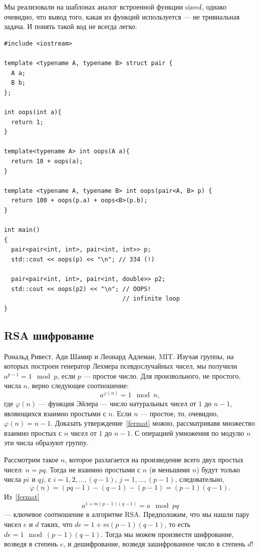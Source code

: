 \documentclass{book}
\begin{document}
Мы реализовали на шаблонах аналог встроенной функции sizeof, однако очевидно, что вывод того, какая
из функций используется --- не тривиальная задача. И понять такой код не всегда легко:
\begin{verbatim}
#include <iostream>

template <typename A, typename B> struct pair {
  A a;
  B b;
};

int oops(int a){
  return 1;
}

template<typename A> int oops(A a){
  return 10 + oops(a);
}

template <typename A, typename B> int oops(pair<A, B> p) {
  return 100 + oops(p.a) + oops<B>(p.b);
}

int main()
{
  pair<pair<int, int>, pair<int, int>> p;
  std::cout << oops(p) << "\n"; // 334 (!)

  pair<pair<int, int>, pair<int, double>> p2;
  std::cout << oops(p2) << "\n"; // OOPS!
                                 // infinite loop
}

\end{verbatim}

\subsection{RSA шифрование}

Рональд Ривест, Ади Шамир и Леонард Адлеман, MIT. Изучая группы, на которых построен генератор
Лехмера псевдослучайных чисел, мы получили $a^{p - 1} = 1 \mod p$, если $p$ --- простое число. Для
произвольного, не простого, числа $n$, верно следующее соотношение:
\begin{equation}
    \label{fermat}
    a^{\varphi(n)} = 1 \mod n,
\end{equation}
где $\varphi(n)$ --- функция Эйлера --- число натуральных чисел от $1$ до $n - 1$, являющихся
взаимно простыми с $n$. Если $n$ --- простое, то, очевидно, $\varphi(n) = n - 1$. Доказать
утверждение~\ref{fermat} можно, рассматривавя множество взаимно простых с $n$ чисел от $1$ до $n -
1$. С операцией умножения по модулю $n$ эти числа образуют группу.

Рассмотрим такое $n$, которое разлагается на произведение всего двух простых чисел: $n = pq$. Тогда
не взаимно простыми с $n$ (и меньшими $n$) будут только числа $pi$ и $q j$, с $i = 1, 2, ..., (q -
1)$, $j = 1,..., (p  - 1)$, следовательно,
\begin{equation}
    \varphi(n) = (p q - 1) - (q - 1) - (p - 1) = (p - 1)(q - 1).
\end{equation}
Из~\ref{fermat}
\begin{equation}
    a^{1 + m (p - 1) (q - 1)} = a \mod pq
\end{equation}
--- ключевое соотношение в алгоритме RSA. Предположим, что мы нашли пару чисел $e$ и $d$ таких, что
$de = 1 + m (p - 1) (q - 1)$, то есть $de = 1 \mod (p - 1) (q - 1)$. Тогда мы можем произвести
шифрование, возведя в степень $e$, и дешифрование, возведя зашифрованное число в степень $d$!
\end{document}
